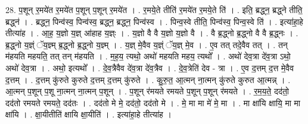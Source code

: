 \documentclass[17pt]{extarticle}
\begin{document}
28. प॒शून् र॒मये॑त र॒मये॑त प॒शून् प॒शून् र॒मये॑त । . र॒मये॒ते तीति॑ र॒मये॑त र॒मये॒ते ति॑ । . इति॒ ब्रद्ध्न॒ ब्रद्ध्ने तीति॒ ब्रद्ध्न॑ । . ब्रद्ध्न॒ पिन्व॑स्व॒ पिन्व॑स्व॒ ब्रद्ध्न॒ ब्रद्ध्न॒ पिन्व॑स्व । . पिन्व॒स्वे तीति॒ पिन्व॑स्व॒ पिन्व॒स्वे ति॑ । . इत्या॑हा॒हे तीत्या॑ह । . आ॒ह॒ य॒ज्ञो य॒ज्ञ् आ॑हाह य॒ज्ञ्ः । . य॒ज्ञो वै वै य॒ज्ञो य॒ज्ञो वै । . वै ब्र॒द्ध्नो ब्र॒द्ध्नो वै वै ब्र॒द्ध्नः । . ब्र॒द्ध्नो य॒ज्ञ्ं ॅय॒ज्ञ्म् ब्र॒द्ध्नो ब्र॒द्ध्नो य॒ज्ञ्म् । . य॒ज्ञ् मे॒वैव य॒ज्ञ्ं ॅय॒ज्ञ् मे॒व । . ए॒व तत् तदे॒वैव तत् । . तन् म॑हयति महयति॒ तत् तन् म॑हयति । . म॒ह॒य॒ त्यथो॒ अथो॑ महयति महय॒ त्यथो᳚ । . अथो॑ देव॒त्रा दे॑व॒त्रा ऽथो॒ अथो॑ देव॒त्रा । . अथो॒ इत्यथो᳚ । . दे॒व॒त्रैवैव दे॑व॒त्रा दे॑व॒त्रैव । . दे॒व॒त्रेति॑ देव - त्रा । . ए॒व द॒त्तम् द॒त्त मे॒वैव द॒त्तम् । . द॒त्तम् कु॑रुते कुरुते द॒त्तम् द॒त्तम् कु॑रुते । . कु॒रु॒त॒ आ॒त्मन् ना॒त्मन् कु॑रुते कुरुत आ॒त्मन्न् । . आ॒त्मन् प॒शून् प॒शू ना॒त्मन् ना॒त्मन् प॒शून् । . प॒शून् र॑मयते रमयते प॒शून् प॒शून् र॑मयते । . र॒म॒य॒ते॒ दद॑तो॒ दद॑तो रमयते रमयते॒ दद॑तः । . दद॑तो मे मे॒ दद॑तो॒ दद॑तो मे । . मे॒ मा मा मे॑ मे॒ मा । . मा क्षा॑यि क्षायि॒ मा मा क्षा॑यि । . क्षा॒यीतीति॑ क्षायि क्षा॒यीति॑ । . इत्या॑हा॒हे तीत्या॑ह । \newline
\end{document}
